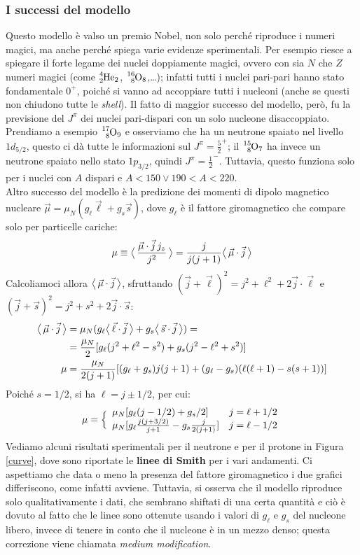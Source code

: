 \subsubsection{I successi del modello} 
Questo modello è valso un premio Nobel, non solo perché riproduce i numeri magici, ma anche perché spiega varie evidenze sperimentali. Per esempio riesce a spiegare il forte legame dei nuclei doppiamente magici, ovvero con sia $N$ che $Z$ numeri magici (come $\ce{^4_2He_2}$, $\ce{^{16}_8O_8}$,\dots); infatti tutti i nuclei pari-pari hanno stato fondamentale $0^+$, poiché si vanno ad accoppiare tutti i nucleoni (anche se questi non chiudono tutte le \textit{shell}). Il fatto di maggior successo del modello, però, fu la previsione del $J^\pi$ dei nuclei pari-dispari con un solo nucleone disaccoppiato. Prendiamo a esempio $\ce{^{17}_8O_9}$ e osserviamo che ha un neutrone spaiato nel livello $1d_{5/2}$, questo ci dà tutte le informazioni sul $J^\pi=\frac{5}{2}^+$; il $\ce{^15_8O_7}$ ha invece un neutrone spaiato nello stato $1p_{3/2}$, quindi $J^\pi = \frac{1}{2}^-$. Tuttavia, questo funziona solo per i nuclei con $A$ dispari e $A<150 \vee 190<A<220$.\\
Altro successo del modello è la predizione dei momenti di dipolo magnetico nucleare $\vec{\mu} = \mu_N (g_\ell \vec{\ell}+g_s \vec{s})$, dove $g_\ell$ è il fattore giromagnetico che compare solo per particelle cariche:
$$\mu \equiv \bigl\langle\, \frac{\vec{\mu}\cdot\vec{j}\, j_z}{j^2}\, \bigr\rangle = \frac{j}{j(j+1)}\bigl\langle\, \vec{\mu}\cdot\vec{j}\, \bigr\rangle$$
Calcoliamoci allora $\bigl\langle\, \vec{\mu}\cdot\vec{j}\, \bigr\rangle$, sfruttando $(\vec{j}+\vec{\ell})^2 = j^2 + \ell^2 +2\vec{j}\cdot\vec{\ell}$ e $(\vec{j}+\vec{s})^2 = j^2 + s^2 +2\vec{j}\cdot\vec{s}$:
\begin{displaymath}
\begin{aligned}
\bigl\langle\, \vec{\mu}\cdot\vec{j}\, \bigr\rangle &= \mu_N (g_\ell \bigl\langle\, \vec{\ell}\cdot\vec{j}\, \bigr\rangle +g_s \bigl\langle\, \vec{s}\cdot\vec{j}\, \bigr\rangle) = \\
&= \frac{\mu_N}{2} [g_\ell (j^2 + \ell^2 - s^2) + g_s (j^2-\ell^2+s^2) ] \\
\mu &= \frac{\mu_N}{2(j+1)} [(g_\ell+g_s) j(j+1) + (g_\ell-g_s) (\ell(\ell+1)-s(s+1))]
\end{aligned}
\end{displaymath}
Poiché $s=1/2$, si ha $\ell=j\pm 1/2$, per cui:
$$\mu = \Bigl \{
\begin{array}{ll}
    \mu_N [g_\ell (j-1/2)+g_s/2] & j = \ell+1/2 \\
    \mu_N [g_\ell \frac{j(j+3/2)}{j+1}- g_s \frac{j}{2(j+1)}] & j = \ell -1/2 
\end{array}$$
Vediamo alcuni risultati sperimentali per il neutrone e per il protone in Figura \ref{curve}, dove sono riportate le \textbf{linee di Smith} per i vari andamenti. Ci aspettiamo che data o meno la presenza del fattore giromagnetico i due grafici differiscono, come infatti avviene. Tuttavia, si osserva che il modello riproduce solo qualitativamente i dati, che sembrano shiftati di una certa quantità e ciò è dovuto al fatto che le linee sono ottenute usando i valori di $g_\ell$ e $g_s$ del nucleone libero, invece di tenere in conto che il nucleone è  in un mezzo denso; questa correzione viene chiamata \textit{medium modification}.

